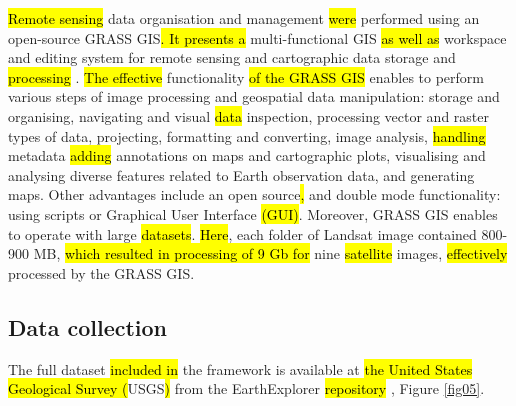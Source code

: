 \documentclass[sustainability,article,submit,pdftex,moreauthors]{Definitions/mdpi}
\begin{document}
\hl{Remote sensing }data organisation and management \hl{were} performed using an open-source GRASS GIS\hl{. It presents a} multi-functional GIS \hl{as well as} workspace and editing system for remote sensing and cartographic data storage and \hl{processing }\cite{NETELER2012124}. \hl{The effective} functionality\hl{ of the GRASS GIS} enables to perform various steps of image processing and geospatial data manipulation: storage and organising, navigating and visual \hl{data }inspection, processing vector and raster types of data, projecting, formatting and converting, image analysis, \hl{handling} metadata\hl{ adding }annotations on maps and cartographic plots, visualising and analysing diverse features related to Earth observation data, and generating maps. Other advantages include an open source\hl{, }and double mode functionality: using\hl{ }scripts or Graphical User Interface \hl{(GUI)}. Moreover, GRASS GIS enables to operate with large \hl{datasets}. \hl{Here}, each folder of Landsat image contained 800-900 MB, \hl{which resulted in processing of 9 Gb for } nine \hl{satellite }images,\hl{ effectively} processed by the GRASS GIS. 
\subsection{Data collection}

The full dataset \hl{included in} the framework is available at \hl{the United States Geological Survey (}USGS\hl{) }from the EarthExplorer \hl{repository }, Figure \ref{fig05}. 
\end{document}
